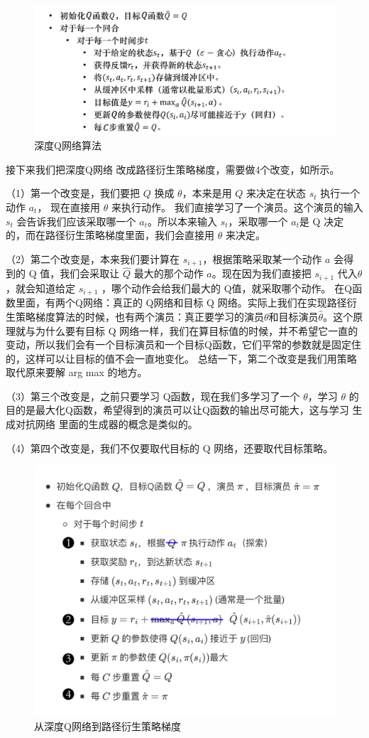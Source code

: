 \begin{figure}[htb]
  \centering
  \includegraphics[width=0.5\linewidth]{res/ch9/9.12}
  \caption{深度Q网络算法}
  \label{fig:fig9.12}
\end{figure}

 接下来我们把深度Q网络 改成路径衍生策略梯度，需要做4个改变，如所示。

（1）第一个改变是，我们要把 $Q$ 换成 $\theta$，本来是用 $Q$ 来决定在状态 $s_t$ 执行一个动作 $a_{t}$， 现在直接用 $\theta$ 来执行动作。
我们直接学习了一个演员。这个演员的输入 $s_t$ 会告诉我们应该采取哪一个 $a_{t}$。所以本来输入 $s_t$，采取哪一个 $a_t$是 Q 决定的，而在路径衍生策略梯度里面，我们会直接用 $\theta$ 来决定。

（2）第二个改变是，本来我们要计算在 $s_{i+1}$，根据策略采取某一个动作 $a$ 会得到的 Q 值，我们会采取让 $\hat{Q}$ 最大的那个动作 $a$。现在因为我们直接把 $s_{i+1}$ 代入$\theta$ ，就会知道给定 $s_{i+1}$ ，哪个动作会给我们最大的 Q值，就采取哪个动作。
在Q函数里面，有两个Q网络：真正的 Q网络和目标 Q 网络。实际上我们在实现路径衍生策略梯度算法的时候，也有两个演员：真正要学习的演员$\theta$和目标演员$\hat{\theta}$。这个原理就与为什么要有目标 Q 网络一样，我们在算目标值的时候，并不希望它一直的变动，所以我们会有一个目标演员和一个目标Q函数，它们平常的参数就是固定住的，这样可以让目标的值不会一直地变化。
总结一下，第二个改变是我们用策略取代原来要解 arg max 的地方。

（3）第三个改变是，之前只要学习 Q函数，现在我们多学习了一个 $\theta$，学习 $\theta$ 的目的是最大化Q函数，希望得到的演员可以让Q函数的输出尽可能大，这与学习 生成对抗网络 里面的生成器的概念是类似的。

（4）第四个改变是，我们不仅要取代目标的 Q 网络，还要取代目标策略。

\begin{figure}[hbt]
  \centering
  \includegraphics[width=0.5\linewidth]{res/ch9/9.13}
  \caption{从深度Q网络到路径衍生策略梯度}
  \label{fig:fig9.13}
\end{figure}

